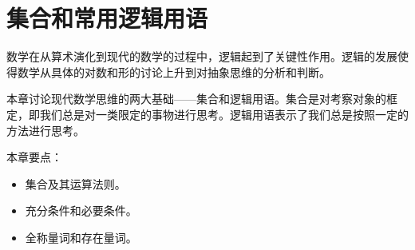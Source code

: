 \chapter{集合和常用逻辑用语}

数学在从算术演化到现代的数学的过程中，逻辑起到了关键性作用。逻辑的发展使得数学从具体的对数和形的讨论上升到对抽象思维的分析和判断。

本章讨论现代数学思维的两大基础——集合和逻辑用语。集合是对考察对象的框定，即我们总是对一类限定的事物进行思考。逻辑用语表示了我们总是按照一定的方法进行思考。

本章要点：
\begin{itemize}
    \item 集合及其运算法则。
    \item 充分条件和必要条件。
    \item 全称量词和存在量词。
\end{itemize}

\newpage


\newpage


\newpage


\newpage


\newpage


\newpage





